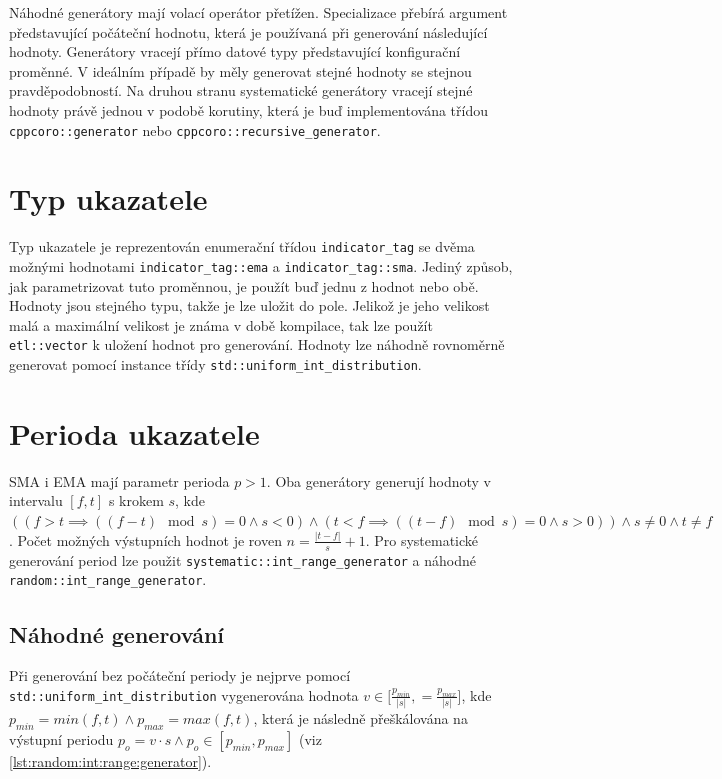 Náhodné generátory mají volací operátor přetížen.
Specializace přebírá argument představující počáteční hodnotu, která je používaná při generování následující hodnoty.
Generátory vracejí přímo datové typy představující konfigurační proměnné.
V ideálním případě by měly generovat stejné hodnoty se stejnou pravděpodobností.
Na druhou stranu systematické generátory vracejí stejné hodnoty právě jednou v podobě korutiny, která je buď implementována třídou \texttt{cppcoro::generator} nebo \texttt{cppcoro::recursive\_generator}.


\section{Typ ukazatele}
Typ ukazatele je reprezentován enumerační třídou \texttt{indicator\_tag} se dvěma možnými hodnotami \texttt{indicator\_tag::ema} a \texttt{indicator\_tag::sma}.
Jediný způsob, jak parametrizovat tuto proměnnou, je použít buď jednu z hodnot nebo obě.
Hodnoty jsou stejného typu, takže je lze uložit do pole.
Jelikož je jeho velikost malá a maximální velikost je známa v době kompilace, tak lze použít \texttt{etl::vector} k uložení hodnot pro generování.
Hodnoty lze náhodně rovnoměrně generovat pomocí instance třídy \texttt{std::uniform\_int\_distribution}.

\section{Perioda ukazatele}
SMA i EMA mají parametr perioda $p>1$.
Oba generátory generují hodnoty v intervalu $[f, t]$ s krokem $s$, kde $((f>t\implies((f-t) \mod s)=0 \land s<0) \land (t<f\implies((t-f) \mod s)=0 \land s>0)) \land s\neq0 \land t\neq f$.
Počet možných výstupních hodnot je roven $n=\frac{|t-f|}{s}+1$.
Pro systematické generování period lze použit \texttt{systematic::int\_range\_generator} a náhodné \texttt{random::int\_range\_generator}.

\subsection{Náhodné generování}
Při generování bez počáteční periody je nejprve pomocí \texttt{std::uniform\_int\_distribution} vygenerována hodnota $ v \in [\frac{p_{min}}{|s|}, = \frac{p_{max}}{|s|}$], kde $p_{min}=min(f, t) \land p_{max}=max(f, t)$, která je následně přeškálována na výstupní periodu $p_o=v\cdot s \land p_o \in [p_{min}, p_{max}]$ (viz \ref{lst:random:int:range:generator}).

